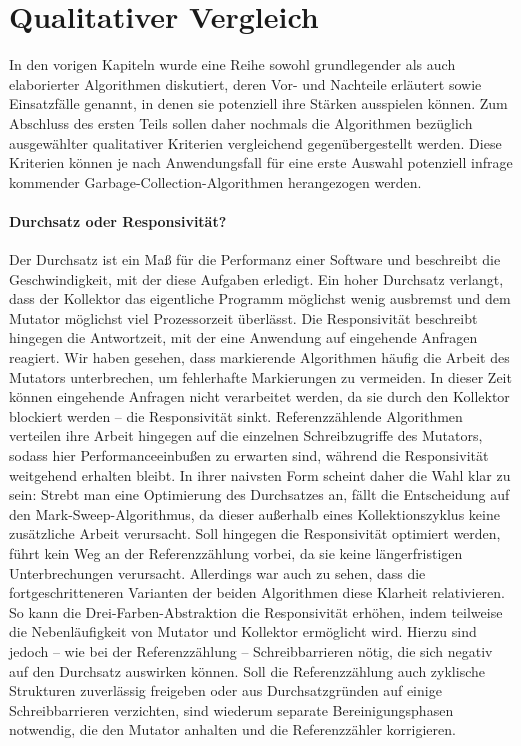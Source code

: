 \chapter{Qualitativer Vergleich}
\label{cha:comparision}

In den vorigen Kapiteln wurde eine Reihe sowohl grundlegender als auch elaborierter Algorithmen diskutiert, deren Vor- und Nachteile erläutert sowie Einsatzfälle genannt, in denen sie potenziell ihre Stärken ausspielen können.
Zum Abschluss des ersten Teils sollen daher nochmals die Algorithmen bezüglich ausgewählter qualitativer Kriterien vergleichend gegenübergestellt werden.
Diese Kriterien können je nach Anwendungsfall für eine erste Auswahl potenziell infrage kommender Garbage-Collection-Algorithmen herangezogen werden.




\subsubsection*{Durchsatz oder Responsivität?}
Der Durchsatz ist ein Maß für die Performanz einer Software und beschreibt die Geschwindigkeit, mit der diese Aufgaben erledigt.
Ein hoher Durchsatz verlangt, dass der Kollektor das eigentliche Programm möglichst wenig ausbremst und dem Mutator möglichst viel Prozessorzeit überlässt.
Die Responsivität beschreibt hingegen die Antwortzeit, mit der eine Anwendung auf eingehende Anfragen reagiert.
Wir haben gesehen, dass markierende Algorithmen häufig die Arbeit des Mutators unterbrechen, um fehlerhafte Markierungen zu vermeiden.
In dieser Zeit können eingehende Anfragen nicht verarbeitet werden, da sie durch den Kollektor blockiert werden -- die Responsivität sinkt.
Referenzzählende Algorithmen verteilen ihre Arbeit hingegen auf die einzelnen Schreibzugriffe des Mutators, sodass hier Performanceeinbußen zu erwarten sind, während die Responsivität weitgehend erhalten bleibt.
In ihrer naivsten Form scheint daher die Wahl klar zu sein:
Strebt man eine Optimierung des Durchsatzes an, fällt die Entscheidung auf den Mark-Sweep-Algorithmus, da dieser außerhalb eines Kollektionszyklus keine zusätzliche Arbeit verursacht.
Soll hingegen die Responsivität optimiert werden, führt kein Weg an der Referenzzählung vorbei, da sie keine längerfristigen Unterbrechungen verursacht.
Allerdings war auch zu sehen, dass die fortgeschritteneren Varianten der beiden Algorithmen diese Klarheit relativieren.
So kann die Drei-Farben-Abstraktion die Responsivität erhöhen, indem teilweise die Nebenläufigkeit von Mutator und Kollektor ermöglicht wird.
Hierzu sind jedoch -- wie bei der Referenzzählung -- Schreibbarrieren nötig, die sich negativ auf den Durchsatz auswirken können.
Soll die Referenzzählung auch zyklische Strukturen zuverlässig freigeben oder aus Durchsatzgründen auf einige Schreibbarrieren verzichten, sind wiederum separate Bereinigungsphasen notwendig, die den Mutator anhalten und die Referenzzähler korrigieren.


